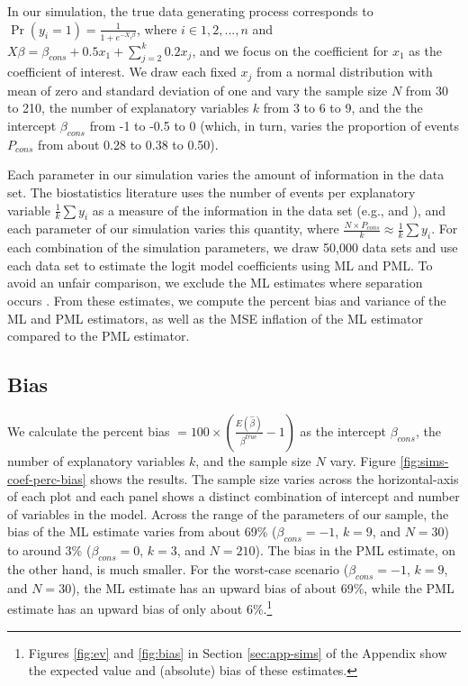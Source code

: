 \documentclass[12pt]{article}
\begin{document}
In our simulation, the true data generating process corresponds to $\Pr(y_i = 1) = \frac{1}{1 + e^{-X_i \beta}}$, where $i \in 1, 2,..., n$ and $X \beta = \beta_{cons} + 0.5 x_1 + \sum_{j = 2}^k 0.2 x_j$, and we focus on the coefficient for $x_1$ as the coefficient of interest.
We draw each fixed $x_j$ from a normal distribution with mean of zero and standard deviation of one and vary the sample size $N$ from 30 to 210, the number of explanatory variables $k$ from 3 to 6 to 9, and the the intercept $\beta_{cons}$ from -1 to -0.5 to 0 (which, in turn, varies the proportion of events $P_{cons}$ from about 0.28 to 0.38 to 0.50).

Each parameter in our simulation varies the amount of information in the data set.
The biostatistics literature uses the number of events per explanatory variable $\frac{1}{k}\sum y_i$ as a measure of the information in the data set (e.g., \citealt{Peduzzietal1996} and \citealt{VittinghoffMcCulloch2007}), and each parameter of our simulation varies this quantity, where $ \frac{N \times P_{cons}}{k} \approx \frac{1}{k}\sum y_i$.
For each combination of the simulation parameters, we draw 50,000 data sets and use each data set to estimate the logit model coefficients using ML and PML. To avoid an unfair comparison, we exclude the ML estimates where separation occurs \citep{Zorn2005}.
From these estimates, we compute the percent bias and variance of the ML and PML estimators, as well as the MSE inflation of the ML estimator compared to the PML estimator.

\subsection*{Bias}

We calculate the percent bias $= 100 \times \left(\frac{E(\hat{\beta})}{\beta^{true}} - 1 \right)$ as the intercept $\beta_{cons}$, the number of explanatory variables $k$, and the sample size $N$ vary.
Figure \ref{fig:sims-coef-perc-bias} shows the results.
The sample size varies across the horizontal-axis of each plot and each panel shows a distinct combination of intercept and number of variables in the model.
Across the range of the parameters of our sample, the bias of the ML estimate varies from about 69\% ($\beta_{cons} = -1$, $k = 9$, and $N = 30$) to around 3\% ($\beta_{cons} = 0$, $k = 3$, and $N = 210$).
The bias in the PML estimate, on the other hand, is much smaller.
For the worst-case scenario ($\beta_{cons} = -1$, $k = 9$, and $N = 30$), the ML estimate has an upward bias of about 69\%, while the PML estimate has an upward bias of only about 6\%.\footnote{Figures \ref{fig:ev} and \ref{fig:bias} in Section \ref{sec:app-sims} of the Appendix show the expected value and (absolute) bias of these estimates.}
\end{document}
